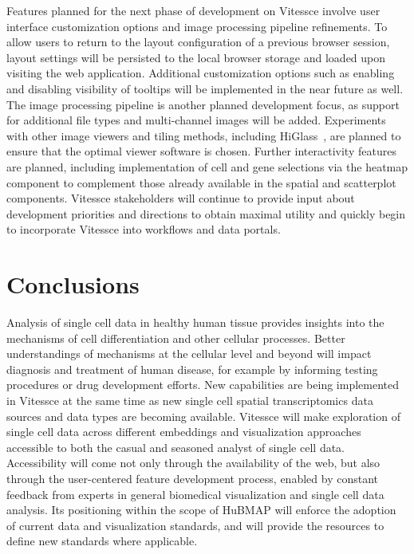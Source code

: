 \documentclass[12pt, letterpaper]{article}
\begin{document}
Features planned for the next phase of development on Vitessce involve user interface customization options and image processing pipeline refinements.
To allow users to return to the layout configuration of a previous browser session, layout settings will be persisted to the local browser storage and loaded upon visiting the web application.
Additional customization options such as enabling and disabling visibility of tooltips will be implemented in the near future as well.
The image processing pipeline is another planned development focus, as support for additional file types and multi-channel images will be added.
Experiments with other image viewers and tiling methods, including HiGlass~\cite{kerpedjiev2018higlass}, are planned to ensure that the optimal viewer software is chosen.
Further interactivity features are planned, including implementation of cell and gene selections via the heatmap component to complement those already available in the spatial and scatterplot components.
Vitessce stakeholders will continue to provide input about development priorities and directions to obtain maximal utility and quickly begin to incorporate Vitessce into workflows and data portals.


\section{Conclusions}
Analysis of single cell data in healthy human tissue provides insights into the mechanisms of cell differentiation and other cellular processes.
Better understandings of mechanisms at the cellular level and beyond will impact diagnosis and treatment of human disease, for example by informing testing procedures or drug development efforts.
New capabilities are being implemented in Vitessce at the same time as new single cell spatial transcriptomics data sources and data types are becoming available.
Vitessce will make exploration of single cell data across different embeddings and visualization approaches accessible to both the casual and seasoned analyst of single cell data.
Accessibility will come not only through the availability of the web, but also through the user-centered feature development process, enabled by constant feedback from experts in general biomedical visualization and single cell data analysis.
Its positioning within the scope of HuBMAP will enforce the adoption of current data and visualization standards, and will provide the resources to define new standards where applicable.
\end{document}

